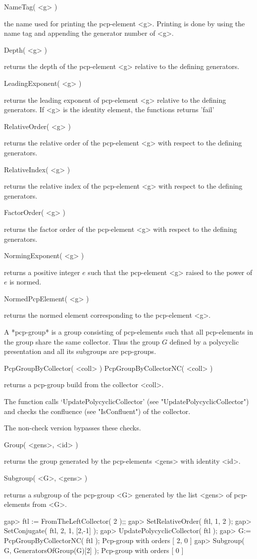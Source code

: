 \>NameTag( <g> )

the name used for  printing the pcp-element <g>.   Printing is done by
using the name tag and appending the generator number of <g>.

\>Depth( <g> )

returns  the  depth of the  pcp-element  <g> relative to  the defining
generators.

\>LeadingExponent( <g> )

returns  the  leading exponent  of  pcp-element  <g>  relative to  the
defining generators.  If  <g> is the  identity element, the  functions
returns 'fail'

\>RelativeOrder( <g> )

returns the relative order of the  pcp-element <g> with respect to the
defining generators.

\>RelativeIndex( <g> )

returns the relative index of the pcp-element <g>  with respect to the
defining generators.

\>FactorOrder( <g> )

returns  the factor order  of the pcp-element <g>  with respect to the
defining generators.

\>NormingExponent( <g> )

returns a positive integer $e$ such that the pcp-element <g> raised to
the power of $e$ is normed.

\>NormedPcpElement( <g> )

returns the normed element corresponding to the pcp-element <g>.


\label{pcpgroup}

A  *pcp-group* is a  group consisting of pcp-elements such that all 
pcp-elements in  the group share  the same collector. Thus the group 
$G$  defined by a polycyclic presentation and all its subgroups are 
pcp-groups. 

\> PcpGroupByCollector( <coll> )
\> PcpGroupByCollectorNC( <coll> )

returns a pcp-group build from the collector <coll>.  

The function calls `UpdatePolycyclicCollector' (see
"UpdatePolycyclicCollector") and checks the confluence (see
"IsConfluent") of the collector.

The non-check version bypasses these checks.

\> Group( <gens>, <id> )

returns the group generated by the pcp-elements <gens> with identity
<id>. 

\> Subgroup( <G>, <gens> )

returns a subgroup of the pcp-group <G> generated by the list <gens> of
pcp-elements from <G>.

\beginexample
gap>  ftl := FromTheLeftCollector( 2 );;
gap>  SetRelativeOrder( ftl, 1, 2 );
gap>  SetConjugate( ftl, 2, 1, [2,-1] );
gap>  UpdatePolycyclicCollector( ftl );
gap>  G:= PcpGroupByCollectorNC( ftl );
Pcp-group with orders [ 2, 0 ]
gap> Subgroup( G, GeneratorsOfGroup(G){[2]} );
Pcp-group with orders [ 0 ]
\endexample

